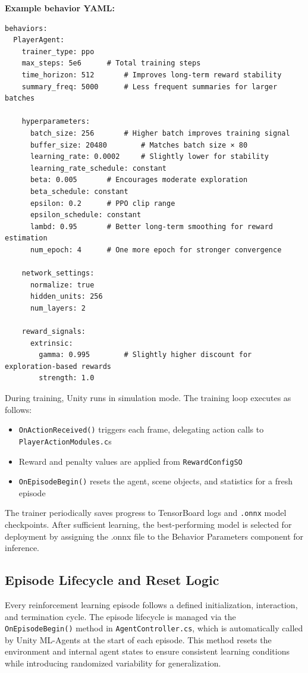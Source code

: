 \documentclass[12pt,oneside,openright,a4paper]{cpe-english-project}
\begin{document}
\textbf{Example behavior YAML:}
\begin{lstlisting}
behaviors:
  PlayerAgent:
    trainer_type: ppo
    max_steps: 5e6		# Total training steps
    time_horizon: 512		# Improves long-term reward stability
    summary_freq: 5000		# Less frequent summaries for larger batches

    hyperparameters:
      batch_size: 256		# Higher batch improves training signal
      buffer_size: 20480		# Matches batch size × 80
      learning_rate: 0.0002		# Slightly lower for stability
      learning_rate_schedule: constant
      beta: 0.005		# Encourages moderate exploration
      beta_schedule: constant
      epsilon: 0.2		# PPO clip range
      epsilon_schedule: constant
      lambd: 0.95		# Better long-term smoothing for reward estimation
      num_epoch: 4		# One more epoch for stronger convergence

    network_settings:
      normalize: true
      hidden_units: 256
      num_layers: 2

    reward_signals:
      extrinsic:
        gamma: 0.995		# Slightly higher discount for exploration-based rewards
        strength: 1.0
\end{lstlisting}

During training, Unity runs in simulation mode. The training loop executes as follows:

\begin{itemize}
\item \texttt{OnActionReceived()} triggers each frame, delegating action calls to \texttt{PlayerActionModules.c}s
\item Reward and penalty values are applied from \texttt{RewardConfigSO}
\item \texttt{OnEpisodeBegin()} resets the agent, scene objects, and statistics for a fresh episode
\end{itemize}

The trainer periodically saves progress to TensorBoard logs and \texttt{.onnx} model checkpoints. After sufficient learning, the best-performing model is selected for deployment by assigning the .onnx file to the Behavior Parameters component for inference.

\subsection{Episode Lifecycle and Reset Logic}

Every reinforcement learning episode follows a defined initialization, interaction, and termination cycle. The episode lifecycle is managed via the \texttt{OnEpisodeBegin()} method in \texttt{AgentController.cs}, which is automatically called by Unity ML-Agents at the start of each episode. This method resets the environment and internal agent states to ensure consistent learning conditions while introducing randomized variability for generalization.
\end{document}
